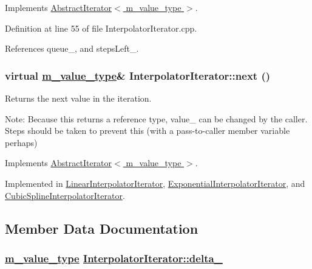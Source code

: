 Implements \hyperlink{classAbstractIterator_a1}{Abstract\-Iterator$<$ m\_\-value\_\-type $>$}.

Definition at line 55 of file Interpolator\-Iterator.cpp.

References queue\_\-, and steps\-Left\_\-.\hypertarget{classInterpolatorIterator_a4}{
\subsubsection[next]{\setlength{\rightskip}{0pt plus 5cm}virtual \hyperlink{Types_8h_a3}{m\_\-value\_\-type}\& Interpolator\-Iterator::next ()}}
\label{classInterpolatorIterator_a4}


Returns the next value in the iteration. \begin{Desc}
\item[Note:]Because this returns a reference type, value\_\- can be changed by the caller. Steps should be taken to prevent this (with a pass-to-caller member variable perhaps) \end{Desc}


Implements \hyperlink{classAbstractIterator_a2}{Abstract\-Iterator$<$ m\_\-value\_\-type $>$}.

Implemented in \hyperlink{classLinearInterpolatorIterator_a2}{Linear\-Interpolator\-Iterator}, \hyperlink{classExponentialInterpolatorIterator_a2}{Exponential\-Interpolator\-Iterator}, and \hyperlink{classCubicSplineInterpolatorIterator_a2}{Cubic\-Spline\-Interpolator\-Iterator}.

\subsection{Member Data Documentation}
\hypertarget{classInterpolatorIterator_p3}{
\subsubsection[delta\_\-]{\setlength{\rightskip}{0pt plus 5cm}\hyperlink{Types_8h_a3}{m\_\-value\_\-type} \hyperlink{classInterpolatorIterator_p3}{Interpolator\-Iterator::delta\_\-}}}
\label{classInterpolatorIterator_p3}


